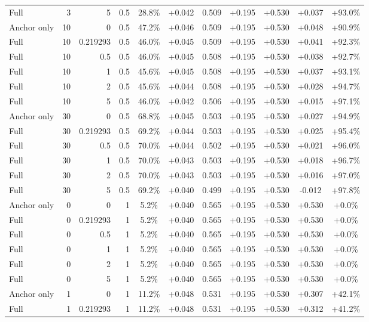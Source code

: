 \begin{table}[htbp]
\begin{tabular}{lrrrccccccc}
Full & 3 & 5 & 0.5 & 28.8\% & +0.042 & 0.509 & +0.195 & +0.530 & +0.037 & +93.0\% \\
Anchor only & 10 & 0 & 0.5 & 47.2\% & +0.046 & 0.509 & +0.195 & +0.530 & +0.048 & +90.9\% \\
Full & 10 & 0.219293 & 0.5 & 46.0\% & +0.045 & 0.509 & +0.195 & +0.530 & +0.041 & +92.3\% \\
Full & 10 & 0.5 & 0.5 & 46.0\% & +0.045 & 0.508 & +0.195 & +0.530 & +0.038 & +92.7\% \\
Full & 10 & 1 & 0.5 & 45.6\% & +0.045 & 0.508 & +0.195 & +0.530 & +0.037 & +93.1\% \\
Full & 10 & 2 & 0.5 & 45.6\% & +0.044 & 0.508 & +0.195 & +0.530 & +0.028 & +94.7\% \\
Full & 10 & 5 & 0.5 & 46.0\% & +0.042 & 0.506 & +0.195 & +0.530 & +0.015 & +97.1\% \\
Anchor only & 30 & 0 & 0.5 & 68.8\% & +0.045 & 0.503 & +0.195 & +0.530 & +0.027 & +94.9\% \\
Full & 30 & 0.219293 & 0.5 & 69.2\% & +0.044 & 0.503 & +0.195 & +0.530 & +0.025 & +95.4\% \\
Full & 30 & 0.5 & 0.5 & 70.0\% & +0.044 & 0.502 & +0.195 & +0.530 & +0.021 & +96.0\% \\
Full & 30 & 1 & 0.5 & 70.0\% & +0.043 & 0.503 & +0.195 & +0.530 & +0.018 & +96.7\% \\
Full & 30 & 2 & 0.5 & 70.0\% & +0.043 & 0.503 & +0.195 & +0.530 & +0.016 & +97.0\% \\
Full & 30 & 5 & 0.5 & 69.2\% & +0.040 & 0.499 & +0.195 & +0.530 & -0.012 & +97.8\% \\
Anchor only & 0 & 0 & 1 & 5.2\% & +0.040 & 0.565 & +0.195 & +0.530 & +0.530 & +0.0\% \\
Full & 0 & 0.219293 & 1 & 5.2\% & +0.040 & 0.565 & +0.195 & +0.530 & +0.530 & +0.0\% \\
Full & 0 & 0.5 & 1 & 5.2\% & +0.040 & 0.565 & +0.195 & +0.530 & +0.530 & +0.0\% \\
Full & 0 & 1 & 1 & 5.2\% & +0.040 & 0.565 & +0.195 & +0.530 & +0.530 & +0.0\% \\
Full & 0 & 2 & 1 & 5.2\% & +0.040 & 0.565 & +0.195 & +0.530 & +0.530 & +0.0\% \\
Full & 0 & 5 & 1 & 5.2\% & +0.040 & 0.565 & +0.195 & +0.530 & +0.530 & +0.0\% \\
Anchor only & 1 & 0 & 1 & 11.2\% & +0.048 & 0.531 & +0.195 & +0.530 & +0.307 & +42.1\% \\
Full & 1 & 0.219293 & 1 & 11.2\% & +0.048 & 0.531 & +0.195 & +0.530 & +0.312 & +41.2\% \\

\end{tabular}
\end{table}
